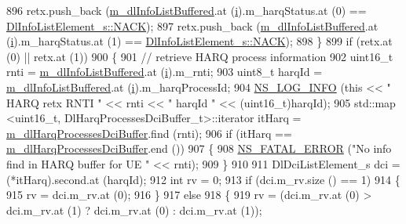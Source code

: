 \begin{DoxyCode}
896           retx.push\_back (\hyperlink{classns3_1_1FdTbfqFfMacScheduler_a72f4bdca7a08fcc26b1618bb9e2d0cf3}{m\_dlInfoListBuffered}.at (\hyperlink{bernuolliDistribution_8m_a6f6ccfcf58b31cb6412107d9d5281426}{i}).m\_harqStatus.at (0) == 
      \hyperlink{structns3_1_1DlInfoListElement__s_a3e55b89f756b7bd8909c8116a202a17aaf90e76e67c86729b4ee21927b7fb1770}{DlInfoListElement\_s::NACK});
897           retx.push\_back (\hyperlink{classns3_1_1FdTbfqFfMacScheduler_a72f4bdca7a08fcc26b1618bb9e2d0cf3}{m\_dlInfoListBuffered}.at (\hyperlink{bernuolliDistribution_8m_a6f6ccfcf58b31cb6412107d9d5281426}{i}).m\_harqStatus.at (1) == 
      \hyperlink{structns3_1_1DlInfoListElement__s_a3e55b89f756b7bd8909c8116a202a17aaf90e76e67c86729b4ee21927b7fb1770}{DlInfoListElement\_s::NACK});
898         \}
899       \textcolor{keywordflow}{if} (retx.at (0) || retx.at (1))
900         \{
901           \textcolor{comment}{// retrieve HARQ process information}
902           uint16\_t rnti = \hyperlink{classns3_1_1FdTbfqFfMacScheduler_a72f4bdca7a08fcc26b1618bb9e2d0cf3}{m\_dlInfoListBuffered}.at (\hyperlink{bernuolliDistribution_8m_a6f6ccfcf58b31cb6412107d9d5281426}{i}).m\_rnti;
903           uint8\_t harqId = \hyperlink{classns3_1_1FdTbfqFfMacScheduler_a72f4bdca7a08fcc26b1618bb9e2d0cf3}{m\_dlInfoListBuffered}.at (\hyperlink{bernuolliDistribution_8m_a6f6ccfcf58b31cb6412107d9d5281426}{i}).m\_harqProcessId;
904           \hyperlink{group__logging_gafbd73ee2cf9f26b319f49086d8e860fb}{NS\_LOG\_INFO} (\textcolor{keyword}{this} << \textcolor{stringliteral}{" HARQ retx RNTI "} << rnti << \textcolor{stringliteral}{" harqId "} << (uint16\_t)harqId);
905           std::map <uint16\_t, DlHarqProcessesDciBuffer\_t>::iterator itHarq = 
      \hyperlink{classns3_1_1FdTbfqFfMacScheduler_a3b740ad89004ff0fce4d87eea57508e5}{m\_dlHarqProcessesDciBuffer}.find (rnti);
906           \textcolor{keywordflow}{if} (itHarq == \hyperlink{classns3_1_1FdTbfqFfMacScheduler_a3b740ad89004ff0fce4d87eea57508e5}{m\_dlHarqProcessesDciBuffer}.end ())
907             \{
908               \hyperlink{group__fatal_ga5131d5e3f75d7d4cbfd706ac456fdc85}{NS\_FATAL\_ERROR} (\textcolor{stringliteral}{"No info find in HARQ buffer for UE "} << rnti);
909             \}
910 
911           DlDciListElement\_s dci = (*itHarq).second.at (harqId);
912           \textcolor{keywordtype}{int} rv = 0;
913           \textcolor{keywordflow}{if} (dci.m\_rv.size () == 1)
914             \{
915               rv = dci.m\_rv.at (0);
916             \}
917           \textcolor{keywordflow}{else}
918             \{
919               rv = (dci.m\_rv.at (0) > dci.m\_rv.at (1) ? dci.m\_rv.at (0) : dci.m\_rv.at (1));

\end{DoxyCode}
